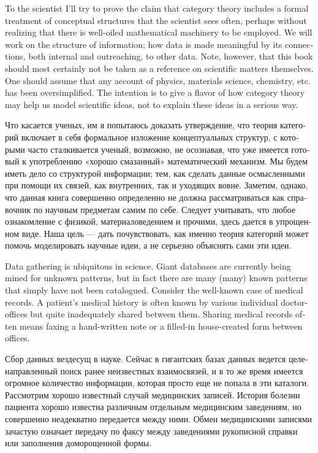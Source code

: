 \documentclass[a4paper]{book}
\theoremstyle{myth}
\begin{document}
\begin{english}
To the scientist I'll try to prove the claim that category theory includes a formal treatment of conceptual structures that the scientist sees often, perhaps without realizing that there is well-oiled mathematical machinery to be employed. We will work on the structure of information; how data is made meaningful by its connections, both internal and outreaching, to other data. Note, however, that this book should most certainly not be taken as a reference on scientific matters themselves. One should assume that any account of physics, materials science, chemistry, etc. has been oversimplified. The intention is to give a flavor of how category theory may help us model scientific ideas, not to explain these ideas in a serious way.

\begin{russian}Что касается ученых, им я попытаюсь доказать утверждение, что теория категорий включает в себя формальное изложение концептуальных структур, с которыми часто сталкивается ученый, возможно, не осознавая, что уже имеется готовый к употреблению «хорошо смазанный» математический механизм. Мы будем иметь дело со структурой информации; тем, как сделать данные осмысленными при помощи их связей, как внутренних, так и уходящих вовне. Заметим, однако, что данная книга совершенно определенно не должна рассматриваться как справочник по научным предметам самим по себе. Следует учитывать, что любое ознакомление с физикой, материаловедением и прочими, здесь дается в упрощенном виде. Наша цель — дать почувствовать, как именно теория категорий может помочь моделировать научные идеи, а не серьезно объяснять сами эти идеи. \end{russian}

Data gathering is ubiquitous in science. Giant databases are currently being mined for unknown patterns, but in fact there are many (many) known patterns that simply have not been catalogued. Consider the well-known case of medical records. A patient's medical history is often known by various individual doctor-offices but quite inadequately shared between them. Sharing medical records often means faxing a hand-written note or a filled-in house-created form between offices.

\begin{russian}Сбор данных вездесущ в науке. Сейчас в гигантских базах данных ведется целенаправленный поиск ранее неизвестных взаимосвязей, и в то же время имеется огромное количество информации, которая просто еще не попала в эти каталоги. Рассмотрим хорошо известный случай медицинских записей. История болезни пациента хорошо известна различным отдельным медицинским заведениям, но совершенно неадекватно передается между ними. Обмен медицинскими записями зачастую означает передачу по факсу между заведениями рукописной справки или заполнения доморощенной формы. \end{russian}


\end{english}
\end{document}
